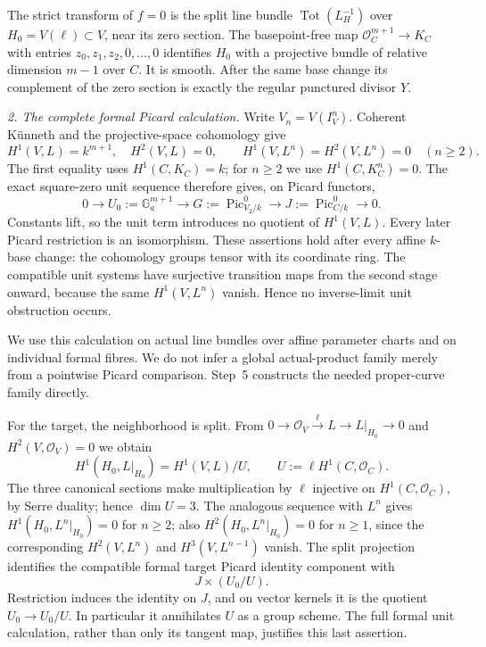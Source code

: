 The strict transform of $f=0$ is the split line bundle
$\operatorname{Tot}(L_H^{-1})$ over
$H_0=V(\ell)\subset V$, near its zero section. The basepoint-free
map $\mathcal O_C^{m+1}\to K_C$ with entries $z_0,z_1,z_2,0,\ldots,0$
identifies $H_0$ with a projective bundle of relative dimension $m-1$
over $C$. It is smooth. After the same base change its complement of
the zero section is exactly the regular punctured divisor $Y$.

\emph{2. The complete formal Picard calculation.}
Write $V_n=V(I_V^n)$. Coherent Künneth and the projective-space
cohomology give
\[
 H^1(V,L)=k^{m+1},\quad H^2(V,L)=0,\qquad
 H^1(V,L^n)=H^2(V,L^n)=0\quad(n\ge2).
\]
The first equality uses $H^1(C,K_C)=k$; for $n\ge2$ we use
$H^1(C,K_C^n)=0$. The exact square-zero unit sequence therefore
gives, on Picard functors,
\[
 0\longrightarrow U_0:=\mathbb G_a^{m+1}
 \longrightarrow G:=\operatorname{Pic}^0_{V_2/k}
 \longrightarrow J:=\operatorname{Pic}^0_{C/k}
 \longrightarrow0.
\]
Constants lift, so the unit term introduces no quotient of
$H^1(V,L)$. Every later Picard restriction is an isomorphism.
These assertions hold after every affine $k$-base change: the
cohomology groups tensor with its coordinate ring. The compatible
unit systems have surjective transition maps from the second stage
onward, because the same $H^1(V,L^n)$ vanish. Hence no inverse-limit
unit obstruction occurs.

We use this calculation on actual line bundles over affine parameter
charts and on individual formal fibres. We do not infer a global
actual-product family merely from a pointwise Picard comparison.
Step~5 constructs the needed proper-curve family directly.

For the target, the neighborhood is split. From
$0\to\mathcal O_V\xrightarrow{\ell}L\to L|_{H_0}\to0$ and
$H^2(V,\mathcal O_V)=0$ we obtain
\[
 H^1(H_0,L|_{H_0})=H^1(V,L)/U,
 \qquad U:=\ell H^1(C,\mathcal O_C).
\]
The three canonical sections make multiplication by $\ell$ injective
on $H^1(C,\mathcal O_C)$, by Serre duality; hence $\dim U=3$.
The analogous sequence with $L^n$ gives
$H^1(H_0,L^n|_{H_0})=0$ for $n\ge2$; also
$H^2(H_0,L^n|_{H_0})=0$ for $n\ge1$, since the corresponding
$H^2(V,L^n)$ and $H^3(V,L^{n-1})$ vanish.
The split projection identifies the compatible formal target
Picard identity component with
\[
 J\times(U_0/U).
\]
Restriction induces the identity on $J$, and on vector kernels it
is the quotient $U_0\to U_0/U$. In particular it annihilates $U$
as a group scheme. The full formal unit calculation, rather than
only its tangent map, justifies this last assertion.

